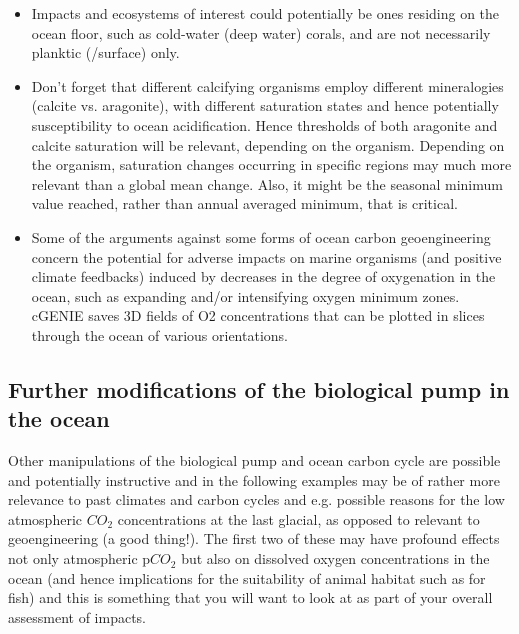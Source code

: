 \documentclass[11pt,fleqn]{book} %
\begin{document}
\begin{itemize}

\item Impacts and ecosystems of interest could potentially be ones residing on the ocean floor, such as cold-water (deep water) corals, and are not necessarily planktic (/surface) only.

\item Don’t forget that different calcifying organisms employ different mineralogies (calcite vs. aragonite), with different saturation states and hence potentially susceptibility to ocean acidification. Hence thresholds of both aragonite and calcite saturation will be relevant, depending on the organism. Depending on the organism, saturation changes occurring in specific regions may much more relevant than a global mean change. Also, it might be the seasonal minimum value reached, rather than annual averaged minimum, that is critical.

\item Some of the arguments against some forms of ocean carbon geoengineering concern the potential for adverse impacts on marine organisms (and positive climate feedbacks) induced by decreases in the degree of oxygenation in the ocean, such as expanding and/or intensifying oxygen minimum zones. cGENIE saves 3D fields of O2 concentrations that can be plotted in slices through the ocean of various orientations.

\end{itemize}


\subsection{Further modifications of the biological pump in the ocean}

Other manipulations of the biological pump and ocean carbon cycle are possible and potentially instructive and in the following examples may be of rather more relevance to past climates and carbon cycles and e.g. possible reasons for the low atmospheric \(CO_{2}\) concentrations at the last glacial, as opposed to relevant to geoengineering (a good thing!). The first two of these may have profound effects not only atmospheric p\(CO_{2}\) but also on dissolved oxygen concentrations in the ocean (and hence implications for the suitability of animal habitat such as for fish) and this is something that you will want to look at as part of your overall assessment of impacts.
\end{document}
